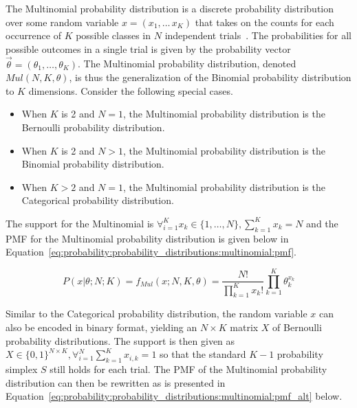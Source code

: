 The Multinomial probability distribution is a discrete probability distribution over some random variable $x = (x_{1}, \dots\, x_{K})$ that takes on the counts for each occurrence of $K$ possible classes in $N$ independent trials~\cite{ref:wackerly:2014}. The probabilities for all possible outcomes in a single trial is given by the probability vector $\vec{\theta} = (\theta_{1}, \dots, \theta_{K})$. The Multinomial probability distribution, denoted $Mul(N, K, \theta)$, is thus the generalization of the Binomial probability distribution to $K$ dimensions. Consider the following special cases.

\begin{itemize}
      \item When $K$ is 2 and $N = 1$, the Multinomial probability distribution is the Bernoulli probability distribution.
      \item When $K$ is 2 and $N > 1$, the Multinomial probability distribution is the Binomial probability distribution.
      \item When $K > 2$ and $N = 1$, the Multinomial probability distribution is the Categorical probability distribution.
\end{itemize}

The support for the Multinomial is $\forall_{i=1}^{K} x_{k} \in \{1, \dots, N\}, \sum_{k=1}^{K}x_{k} = N$ and the \acs{PMF} for the Multinomial probability distribution is given below in Equation~\eqref{eq:probability:probability_distributions:multinomial:pmf}.

\begin{equation}
      \label{eq:probability:probability_distributions:multinomial:pmf}
      P(x \vert \theta; N; K) = f_{Mul}(x; N, K, \theta) = \frac{N!}{\prod_{k=1}^{K}x_{k}!} \prod_{k=1}^{K}\theta_{k}^{x_{k}}
\end{equation}

Similar to the Categorical probability distribution, the random variable $x$ can also be encoded in binary format, yielding an $N \times K$ matrix $X$ of Bernoulli probability distributions. The support is then given as $X \in \{0, 1\}^{N \times K}, \forall_{i=1}^{N}\sum_{k=1}^{K} x_{i,k} = 1$ so that the standard $K-1$ probability simplex $S$ still holds for each trial. The \acs{PMF} of the Multinomial probability distribution can then be rewritten as is presented in Equation~\eqref{eq:probability:probability_distributions:multinomial:pmf_alt} below.

